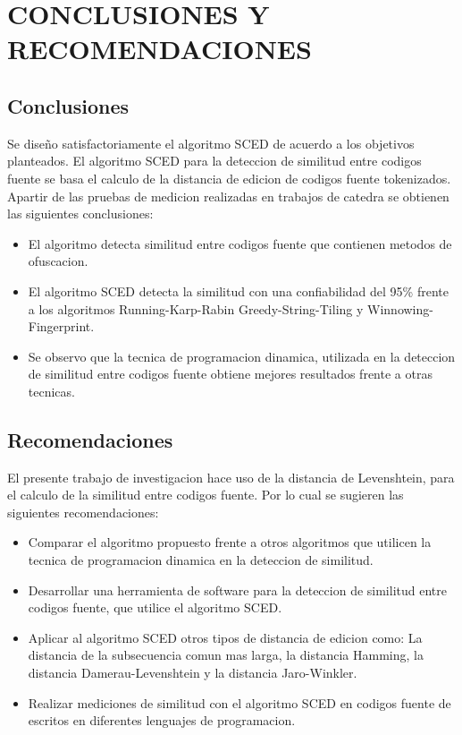\chapter{CONCLUSIONES Y RECOMENDACIONES}
\section{Conclusiones}
Se diseño satisfactoriamente el algoritmo SCED de acuerdo a los objetivos planteados. El algoritmo SCED para la deteccion de similitud entre codigos fuente se basa el calculo de la distancia de edicion de codigos fuente tokenizados. Apartir de las pruebas de medicion realizadas en trabajos de catedra se obtienen las siguientes conclusiones:

\begin{itemize}
  \item El algoritmo detecta similitud entre codigos fuente que contienen metodos de ofuscacion.
  \item El algoritmo SCED detecta la similitud con una confiabilidad del 95\% frente a los algoritmos Running-Karp-Rabin Greedy-String-Tiling y Winnowing-Fingerprint.
  \item Se observo que la tecnica de programacion dinamica, utilizada en la deteccion de similitud entre codigos fuente obtiene mejores resultados frente a otras tecnicas.
\end{itemize}

\section{Recomendaciones}
El presente trabajo de investigacion hace uso de la distancia de Levenshtein, para el calculo de la similitud entre codigos fuente. Por lo cual se sugieren las siguientes recomendaciones:
\begin{itemize}
  \item Comparar el algoritmo propuesto frente a otros algoritmos que utilicen la tecnica de programacion dinamica en la deteccion de similitud.
  \item Desarrollar una herramienta de software para la deteccion de similitud entre codigos fuente, que utilice el algoritmo SCED.
  \item Aplicar al algoritmo SCED otros tipos de distancia de edicion como: La distancia de la subsecuencia comun mas larga, la distancia Hamming, la distancia Damerau-Levenshtein y la distancia Jaro-Winkler.
  \item Realizar mediciones de similitud con el algoritmo SCED en codigos fuente de escritos en diferentes lenguajes de programacion.
\end{itemize}
